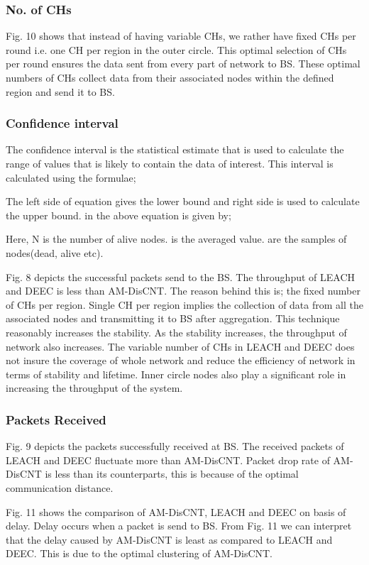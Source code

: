 \documentclass[journal]{IEEEtran}
\begin{document}
\subsubsection{No. of CHs}
 Fig. 10 shows that instead of having variable CHs, we rather have fixed CHs per round i.e. one CH per region in the outer circle. This optimal selection of CHs per round ensures the data sent from every part of network to BS. These optimal numbers of CHs collect data from their associated nodes within the defined region and send it to BS.


\subsubsection{Confidence interval}
The confidence interval is the statistical estimate that is used to calculate the range of values that is likely to contain the data of interest. This interval is calculated using the formulae;
      

  The left side of equation gives the lower bound and right side is used to calculate the upper bound.  in the above equation is given by;
      
  Here, N is the number of alive nodes.  is the averaged value.  are the samples of nodes(dead, alive etc).

 Fig. 8 depicts the successful packets send to the BS. The throughput of LEACH and DEEC is less than AM-DisCNT. The reason behind this is; the fixed number of CHs per region. Single CH per region implies the collection of data from all the associated nodes and transmitting it to BS after aggregation. This technique reasonably increases the stability. As the stability increases, the throughput of network also increases. The variable number of CHs in LEACH and DEEC does not insure the coverage of whole network and reduce the efficiency of network in terms of stability and lifetime. Inner circle nodes also play a significant role in increasing the throughput of the system.

 \subsubsection{Packets Received}
 Fig. 9 depicts the packets successfully received at BS. The received packets of LEACH and DEEC fluctuate more than AM-DisCNT. Packet drop rate of AM-DisCNT is less than its counterparts, this is because of the optimal communication distance.

 Fig. 11 shows the comparison of AM-DisCNT, LEACH and DEEC on basis of delay. Delay occurs when a packet is send to BS. From Fig. 11 we can interpret that the delay caused by AM-DisCNT is least as compared to LEACH and DEEC. This is due to the optimal clustering of AM-DisCNT.
\end{document}

